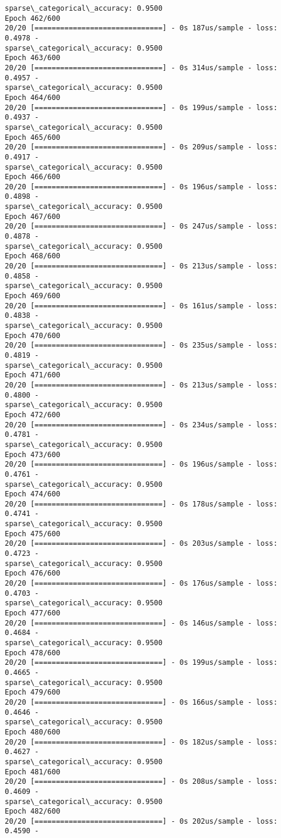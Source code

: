\documentclass[11pt]{article}
\begin{document}
\begin{Verbatim}[commandchars=\\\{\}]
sparse\_categorical\_accuracy: 0.9500
Epoch 462/600
20/20 [==============================] - 0s 187us/sample - loss: 0.4978 -
sparse\_categorical\_accuracy: 0.9500
Epoch 463/600
20/20 [==============================] - 0s 314us/sample - loss: 0.4957 -
sparse\_categorical\_accuracy: 0.9500
Epoch 464/600
20/20 [==============================] - 0s 199us/sample - loss: 0.4937 -
sparse\_categorical\_accuracy: 0.9500
Epoch 465/600
20/20 [==============================] - 0s 209us/sample - loss: 0.4917 -
sparse\_categorical\_accuracy: 0.9500
Epoch 466/600
20/20 [==============================] - 0s 196us/sample - loss: 0.4898 -
sparse\_categorical\_accuracy: 0.9500
Epoch 467/600
20/20 [==============================] - 0s 247us/sample - loss: 0.4878 -
sparse\_categorical\_accuracy: 0.9500
Epoch 468/600
20/20 [==============================] - 0s 213us/sample - loss: 0.4858 -
sparse\_categorical\_accuracy: 0.9500
Epoch 469/600
20/20 [==============================] - 0s 161us/sample - loss: 0.4838 -
sparse\_categorical\_accuracy: 0.9500
Epoch 470/600
20/20 [==============================] - 0s 235us/sample - loss: 0.4819 -
sparse\_categorical\_accuracy: 0.9500
Epoch 471/600
20/20 [==============================] - 0s 213us/sample - loss: 0.4800 -
sparse\_categorical\_accuracy: 0.9500
Epoch 472/600
20/20 [==============================] - 0s 234us/sample - loss: 0.4781 -
sparse\_categorical\_accuracy: 0.9500
Epoch 473/600
20/20 [==============================] - 0s 196us/sample - loss: 0.4761 -
sparse\_categorical\_accuracy: 0.9500
Epoch 474/600
20/20 [==============================] - 0s 178us/sample - loss: 0.4741 -
sparse\_categorical\_accuracy: 0.9500
Epoch 475/600
20/20 [==============================] - 0s 203us/sample - loss: 0.4723 -
sparse\_categorical\_accuracy: 0.9500
Epoch 476/600
20/20 [==============================] - 0s 176us/sample - loss: 0.4703 -
sparse\_categorical\_accuracy: 0.9500
Epoch 477/600
20/20 [==============================] - 0s 146us/sample - loss: 0.4684 -
sparse\_categorical\_accuracy: 0.9500
Epoch 478/600
20/20 [==============================] - 0s 199us/sample - loss: 0.4665 -
sparse\_categorical\_accuracy: 0.9500
Epoch 479/600
20/20 [==============================] - 0s 166us/sample - loss: 0.4646 -
sparse\_categorical\_accuracy: 0.9500
Epoch 480/600
20/20 [==============================] - 0s 182us/sample - loss: 0.4627 -
sparse\_categorical\_accuracy: 0.9500
Epoch 481/600
20/20 [==============================] - 0s 208us/sample - loss: 0.4609 -
sparse\_categorical\_accuracy: 0.9500
Epoch 482/600
20/20 [==============================] - 0s 202us/sample - loss: 0.4590 -

\end{Verbatim}
\end{document}
